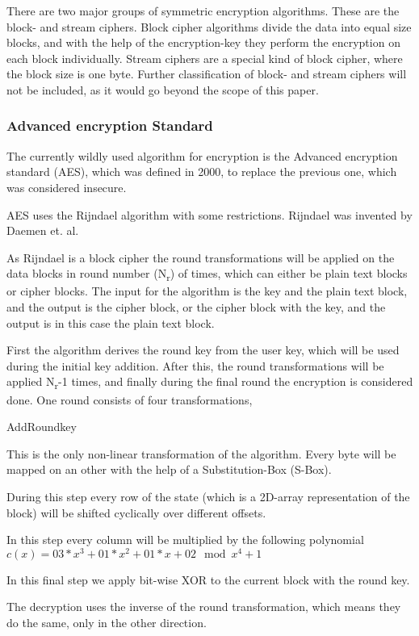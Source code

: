 \documentclass[12pt,a4paper,titlepage,oneside]{scrartcl}
\begin{document}
There are two major groups of symmetric encryption algorithms.
These are the block- and stream ciphers.
Block cipher algorithms divide the data into equal size blocks, and with the help of the encryption-key they perform the encryption on each block individually.
Stream ciphers are a special kind of block cipher, where the block size is one byte. \cite{menezes1996handbook}
Further classification of block- and stream ciphers will not be included, as it would go beyond the scope of this paper.

\subsubsection{Advanced encryption Standard}
The currently wildly used algorithm for encryption is the Advanced encryption standard (AES), which was defined in 2000, to replace the previous one, which was considered insecure.

AES uses the Rijndael algorithm with some restrictions.
Rijndael was invented by Daemen et. al. \cite{daemen2013design}

As Rijndael is a block cipher the round transformations will be applied on the data blocks in round number (N\textsubscript{r}) of times, which can either be plain text blocks or cipher blocks.
The input for the algorithm is the key and the plain text block, and the output is the cipher block, or the cipher block with the key, and the output is in this case the plain text block. \cite{daemen2013design}

First the algorithm derives the round key from the user key, which will be used during the initial key addition.
After this, the round transformations will be applied N\textsubscript{r}-1 times, and finally during the final round the encryption is considered done.
One round consists of four transformations,
\begin{labeling}{AddRoundkey}
\item [SubBytes] This is the only non-linear transformation of the algorithm. Every byte will be mapped on an other with the help of a Substitution-Box (S-Box).
\item [ShiftRows] During this step every row of the state (which is a 2D-array representation of the block) will be shifted cyclically over different offsets.
\item [MixColumns] In this step every column will be multiplied by the following polynomial \begin{math} c(x) = 03 * x^3 + 01 * x^2 + 01 * x + 02 \mod x^4 + 1 \end{math}
\item [AddRoundkey] In this final step we apply bit-wise XOR to the current block with the round key.
\end{labeling}
The decryption uses the inverse of the round transformation, which means they do the same, only in the other direction. \cite{daemen2013design}
\end{document}
